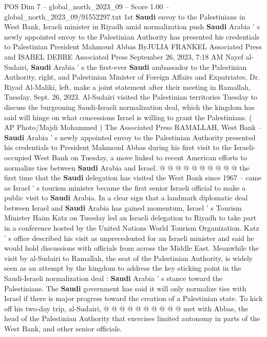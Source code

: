 \begin{textsample}{POS Dim 7 – global\_north\_2023\_09 – Score 1.00 – global\_north\_2023\_09/91552297.txt}  \label{ex:f7_pos_283}
1st \textbf{Saudi} envoy to the Palestinians in West Bank, Israeli minister in Riyadh amid normalization push \textbf{Saudi} Arabia ' s newly appointed envoy to the Palestinian Authority has presented his credentials to Palestinian President Mahmoud Abbas ByJULIA FRANKEL Associated Press and ISABEL DEBRE Associated Press September 26, 2023, 7:18 AM Nayef al-Sudairi, \textbf{Saudi} Arabia ' s the first-ever \textbf{Saudi} ambassador to the Palestinian Authority, right, and Palestinian Minister of Foreign Affairs and Expatriates, Dr.
Riyad Al-Maliki, left, make a joint statement after their meeting in Ramallah, Tuesday, Sept. 26, 2023.
Al-Sudairi visited the Palestinian territories Tuesday to discuss the burgeoning Saudi-Israeli normalization deal, which the kingdom has said will hinge on what concessions Israel is willing to grant the Palestinians. ( AP Photo/Majdi Mohammed ) The Associated Press RAMALLAH, West Bank -- \textbf{Saudi} Arabia ' s newly appointed envoy to the Palestinian Authority presented his credentials to President Mahmoud Abbas during his first visit to the Israeli-occupied West Bank on Tuesday, a move linked to recent American efforts to normalize ties between \textbf{Saudi} Arabia and Israel. @ @ @ @ @ @ @ @ @ @ the first time that the \textbf{Saudi} delegation has visited the West Bank since 1967 -- came as Israel ' s tourism minister became the first senior Israeli official to make a public visit to \textbf{Saudi} Arabia.
In a clear sign that a landmark diplomatic deal between Israel and \textbf{Saudi} Arabia has gained momentum, Israel ' s Tourism Minister Haim Katz on Tuesday led an Israeli delegation to Riyadh to take part in a conference hosted by the United Nations World Tourism Organization.
Katz ' s office described his visit as unprecedented for an Israeli minister and said he would hold discussions with officials from across the Middle East.
Meanwhile the visit by al-Sudairi to Ramallah, the seat of the Palestinian Authority, is widely seen as an attempt by the kingdom to address the key sticking point in the Saudi-Israeli normalization deal : \textbf{Saudi} Arabia ' s stance toward the Palestinians.
The \textbf{Saudi} government has said it will only normalize ties with Israel if there is major progress toward the creation of a Palestinian state.
To kick off his two-day trip, al-Sudairi, @ @ @ @ @ @ @ @ @ @ met with Abbas, the head of the Palestinian Authority that exercises limited autonomy in parts of the West Bank, and other senior officials.

\end{textsample}
